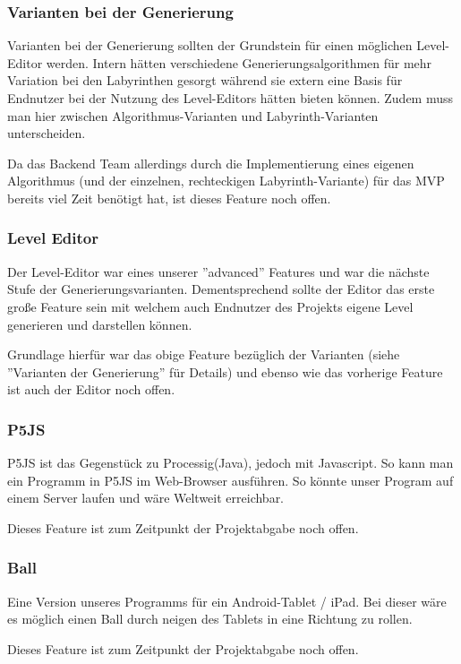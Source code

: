     \subsubsection*{Varianten bei der Generierung}
        Varianten bei der Generierung sollten der Grundstein für einen möglichen Level-Editor werden. Intern hätten verschiedene Generierungsalgorithmen für mehr Variation bei den Labyrinthen gesorgt während sie extern eine Basis für Endnutzer bei der Nutzung des Level-Editors hätten bieten können. Zudem muss man hier zwischen Algorithmus-Varianten und Labyrinth-Varianten unterscheiden. 
        
        Da das Backend Team allerdings durch die Implementierung eines eigenen Algorithmus (und der einzelnen, rechteckigen Labyrinth-Variante) für das MVP bereits viel Zeit benötigt hat, ist dieses Feature noch offen. 


    \subsubsection*{Level Editor}
        Der Level-Editor war eines unserer ''advanced'' Features und war die nächste Stufe der Generierungsvarianten. Dementsprechend sollte der Editor das erste große Feature sein mit welchem auch Endnutzer des Projekts eigene Level generieren und darstellen können. 
        
        Grundlage hierfür war das obige Feature bezüglich der Varianten (siehe ''Varianten der Generierung'' für Details) und ebenso wie das vorherige Feature ist auch der Editor noch offen. 


    \subsubsection*{P5JS}
		P5JS ist das Gegenstück zu Processig(Java), jedoch mit Javascript. So kann man ein Programm in P5JS im Web-Browser ausführen. So könnte unser Program auf einem Server laufen  und wäre Weltweit erreichbar. 
		
		Dieses Feature ist zum Zeitpunkt der Projektabgabe noch offen.
		 

    \subsubsection*{Ball}
    	Eine Version unseres Programms für ein Android-Tablet / iPad. Bei dieser wäre es möglich einen Ball durch neigen des Tablets in eine Richtung zu rollen.
    	
    	Dieses Feature ist zum Zeitpunkt der Projektabgabe noch offen.

		
 
		
  
